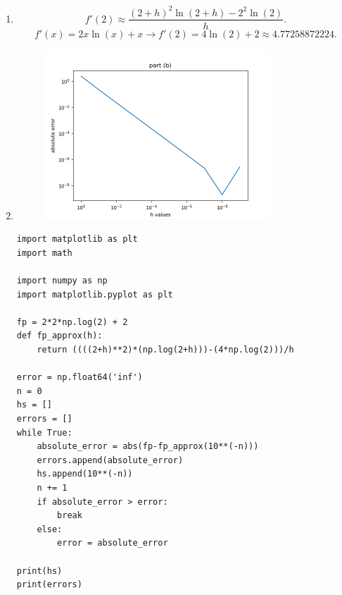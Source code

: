 \documentclass{amsart}
\begin{document}
     \begin{enumerate}[label = (\alph*)]
         \item 
             \[
             f'(2) \approx \frac{(2+h)^2\ln(2+h) - 2^2\ln(2)}{h}
             .\] 
             \[
             f'(x) = 2x\ln(x) + x \rightarrow f'(2) = 4\ln(2) + 2 \approx 4.77258872224
             .\] 
         \item 
             \begin{figure}[h]
                 \centering
                 \includegraphics[width=0.8\textwidth]{part_b.png}
             \end{figure}
             \begin{lstlisting}
import matplotlib as plt
import math

import numpy as np
import matplotlib.pyplot as plt

fp = 2*2*np.log(2) + 2
def fp_approx(h):
    return ((((2+h)**2)*(np.log(2+h)))-(4*np.log(2)))/h

error = np.float64('inf')
n = 0
hs = []
errors = []
while True:
    absolute_error = abs(fp-fp_approx(10**(-n)))
    errors.append(absolute_error)
    hs.append(10**(-n))
    n += 1
    if absolute_error > error:
        break
    else:
        error = absolute_error

print(hs)
print(errors)



\end{lstlisting}
\end{enumerate}
\end{document}
